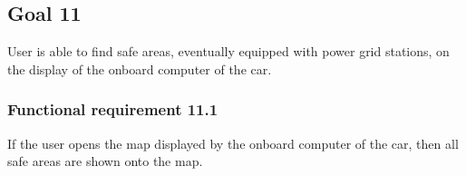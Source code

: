 \subsection{Goal 11}
User is able to find safe areas, eventually equipped with power grid stations, on the display of the onboard computer of the car.

\setcounter{secnumdepth}{3}
\subsubsection{Functional requirement 11.1}
If the user opens the map displayed by the onboard computer of the car, then all safe areas are shown onto the map.